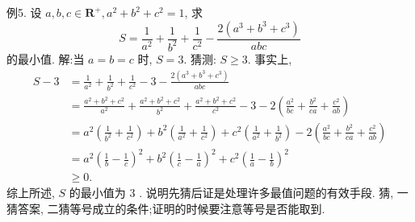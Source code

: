 例5. 设 $a, b, c \in \mathbf{R}^{+}, a^2+b^2+c^2=1$, 求
$$
S=\frac{1}{a^2}+\frac{1}{b^2}+\frac{1}{c^2}-\frac{2\left(a^3+b^3+c^3\right)}{a b c}
$$
的最小值.
解:当 $a=b=c$ 时, $S=3$. 猜测: $S \geqslant 3$.
事实上,
$$
\begin{aligned}
S-3 & =\frac{1}{a^2}+\frac{1}{b^2}+\frac{1}{c^2}-3-\frac{2\left(a^3+b^3+c^3\right)}{a b c} \\
& =\frac{a^2+b^2+c^2}{a^2}+\frac{a^2+b^2+c^2}{b^2}+\frac{a^2+b^2+c^2}{c^2}-3-2\left(\frac{a^2}{b c}+\frac{b^2}{c a}+\frac{c^2}{a b}\right) \\
& =a^2\left(\frac{1}{b^2}+\frac{1}{c^2}\right)+b^2\left(\frac{1}{a^2}+\frac{1}{c^2}\right)+c^2\left(\frac{1}{a^2}+\frac{1}{b^2}\right)-2\left(\frac{a^2}{b c}+\frac{b^2}{c a}+\frac{c^2}{a b}\right) \\
& =a^2\left(\frac{1}{b}-\frac{1}{c}\right)^2+b^2\left(\frac{1}{c}-\frac{1}{a}\right)^2+c^2\left(\frac{1}{a}-\frac{1}{b}\right)^2 \\
& \geqslant 0 .
\end{aligned}
$$
综上所述, $S$ 的最小值为 3 .
说明先猜后证是处理许多最值问题的有效手段.
猜, 一猜答案, 二猜等号成立的条件;证明的时候要注意等号是否能取到.



